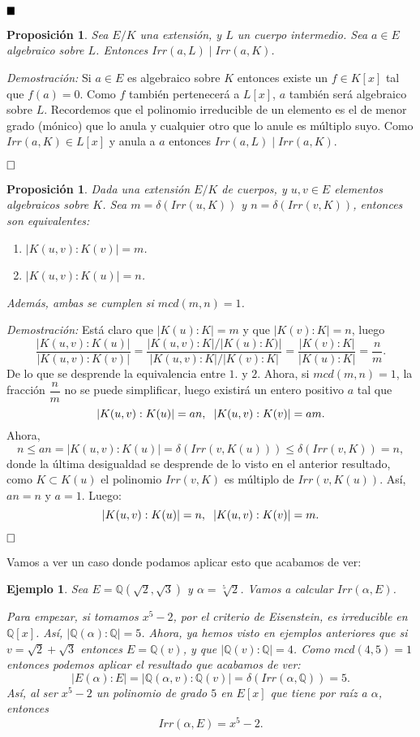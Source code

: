\documentclass[12pt]{article}
\newtheorem{proposition}[theorem]{Proposición}
\newtheorem{example}{Ejemplo}[theorem]
\begin{document}
$\hfill \blacksquare$

\begin{proposition} Sea $E/K$ una extensión, y $L$ un cuerpo intermedio. Sea $a \in E$ algebraico sobre $L$. Entonces $Irr(a, L) \mid Irr (a, K)$.
\end{proposition}
\emph{Demostración: }Si $a \in E$ es algebraico sobre $K$ entonces existe un $f \in K[x]$ tal que $f(a) = 0$. Como $f$ también pertenecerá a $L[x]$, $a$ también será algebraico sobre $L$. Recordemos que el polinomio irreducible de un elemento es el de menor grado (mónico) que lo anula y cualquier otro que lo anule es múltiplo suyo. Como $Irr(a,K) \in L[x]$ y anula a $a$ entonces $Irr(a, L) \mid Irr(a,K)$.

$\hfill \square$

\begin{proposition} Dada una extensión $E/K$ de cuerpos, y $u,v \in E$ elementos algebraicos sobre $K$. Sea $m = \delta(Irr(u, K))$ y $n = \delta(Irr(v,K))$, entonces son equivalentes: \begin{enumerate}
\item $|K(u,v) :K(v) | = m$.
\item $|K(u,v) : K(u) | = n$.
\end{enumerate}
Además, ambas se cumplen si $mcd(m,n) = 1$.
\end{proposition}
\emph{Demostración: }
Está claro que $|K(u) : K| = m$ y que $|K(v) : K| = n$, luego $$\dfrac{|K(u,v):K(u)|}{|K(u,v):K(v)|} = \dfrac{|K(u,v):K|/|K(u):K)|}{|K(u,v):K|/|K(v):K|} = \dfrac{|K(v):K|}{|K(u):K|} = \dfrac{n}{m}.$$
De lo que se desprende la equivalencia entre $1.$ y $2.$ Ahora, si $mcd(m,n) = 1$, la fracción $\dfrac{n}{m}$ no se puede simplificar, luego existirá un entero positivo $a$ tal que $$|K(u,v):K(u)| = an, \hspace{0.2cm} |K(u,v):K(v)| = am.$$ Ahora, $$n \leq an = |K(u,v):K(u)| = \delta(Irr(v, K(u))) \leq \delta (Irr(v,K)) = n,$$ donde la última desigualdad se desprende de lo visto en el anterior resultado, como $K \subset K(u)$ el polinomio $Irr(v,K)$ es múltiplo de $Irr(v,K(u))$. Así, $an = n$ y $a = 1$. Luego: $$|K(u,v):K(u)| = n, \hspace{0.2cm} |K(u,v):K(v)| = m.$$


$\hfill \square$

Vamos a ver un caso donde podamos aplicar esto que acabamos de ver:
\begin{example} Sea $E = \mathbb{Q}(\sqrt{2}, \sqrt{3})$ y $\alpha = \sqrt[5]{2}$. Vamos a calcular $Irr(\alpha, E)$.

Para empezar, si tomamos $x^{5}-2$, por el criterio de Eisenstein, es irreducible en $\mathbb{Q}[x]$. Así, $|\mathbb{Q}(\alpha) : \mathbb{Q}| = 5$. Ahora, ya hemos visto en ejemplos anteriores que si $v = \sqrt{2}+ \sqrt{3}$ entonces $E = \mathbb{Q}(v)$, y que $|\mathbb{Q}(v) : \mathbb{Q}| = 4$. Como $mcd(4,5) = 1$ entonces podemos aplicar el resultado que acabamos de ver: $$|E(\alpha) : E| = |\mathbb{Q}(\alpha,v) : \mathbb{Q}(v) | = \delta (Irr(\alpha, \mathbb{Q})) = 5.$$ Así, al ser $x^{5}-2$ un polinomio de grado $5$ en $E[x]$ que tiene por raíz a $\alpha$, entonces $$Irr(\alpha, E) = x^{5}-2.$$
\end{example}
\end{document}
